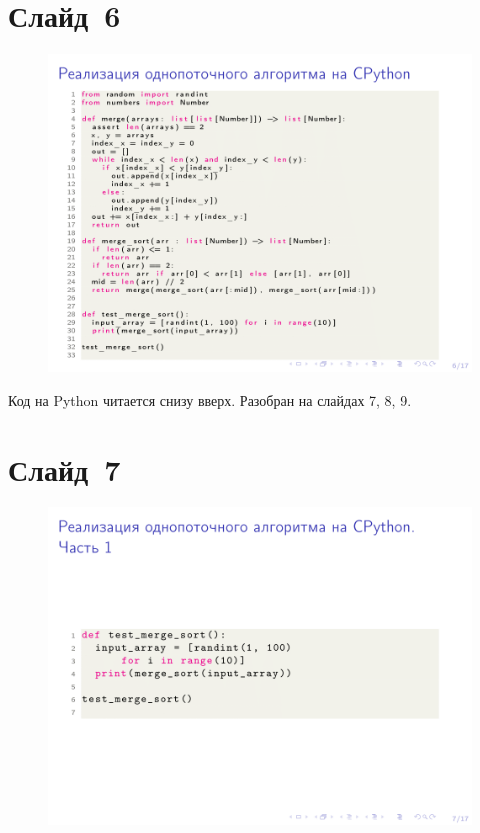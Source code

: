 \documentclass[aps,pre,reprint]{revtex4-2}
\begin{document}
	\section{Слайд~6}
	\begin{figure}[H]
		\includegraphics[scale=.7]{presentation-06.png}
	\end{figure}
	
	Код на Python читается снизу вверх. Разобран на слайдах 7, 8, 9.
	
	\section{Слайд~7}
	\begin{figure}[H]
		\includegraphics[scale=.7]{presentation-07.png}
	\end{figure}
	
\end{document}
